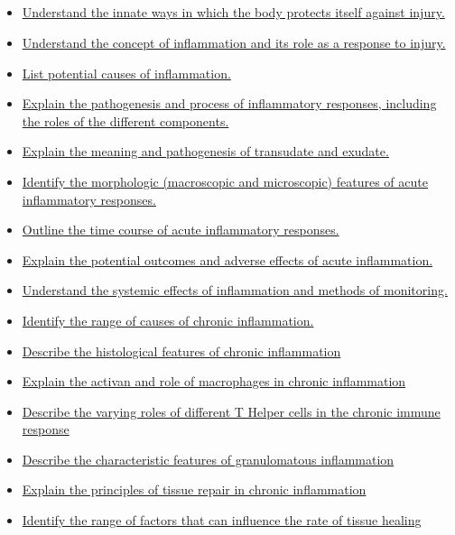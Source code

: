 \documentclass[10pt, a4paper]{article}
\newcommand{\MYhref}[3][blue]{\href{#2}{\color{#1}{#3}}}%
\begin{document}
\subsection{\MYhref[melbBlue]{https://notion.so/cfb3d9aecdcc461dbc4827f65294d71f}{Inflammation and Repair}} \begin{itemize} \item \href{https://www.notion.so/7a16210c4f044e0098a97ffd02f6284f}{Understand the innate ways in which the body protects itself against injury.} \item \href{https://www.notion.so/de0ad94c4ee7499f9188441b21b9ba35}{Understand the concept of inflammation and its role as a response to injury.} \item \href{https://www.notion.so/abeaf83d13394d3c971aca815b807020}{List potential causes of inflammation.} \item \href{https://www.notion.so/6f9427a3ba9648a78dfc0df6c00f97a3}{Explain the pathogenesis and process of inflammatory responses, including the roles of the different components.} \item \href{https://www.notion.so/e31f59b9f575471f96d0807f3c8216f6}{Explain the meaning and pathogenesis of transudate and exudate.} \item \href{https://www.notion.so/513317b8354b46ba98426fb92a0c48e1}{Identify the morphologic (macroscopic and microscopic) features of acute inflammatory responses.} \item \href{https://www.notion.so/9acba085bc0c44fe9d8ce8ffb4d723aa}{Outline the time course of acute inflammatory responses.} \item \href{https://www.notion.so/2c37b88df00d4c98aea370348fa4ce94}{Explain the potential outcomes and adverse effects of acute inflammation.} \item \href{https://www.notion.so/5d231658573a4abd99cfda5de47fffb1}{Understand the systemic effects of inflammation and methods of monitoring.} \item \href{https://www.notion.so/788e7652afc241fa99d123c543353672}{Identify the range of causes of chronic inflammation.} \item \href{https://www.notion.so/799a41fc8d26485ea00ac10335491a01}{Describe the histological features of chronic inflammation} \item \href{https://www.notion.so/898a508391ba4bee88f7a78f1ef57035}{Explain the activan and role of macrophages in chronic inflammation} \item \href{https://www.notion.so/aaba507b478e4d8897051be0db1bafc5}{Describe the varying roles of different T Helper cells in the chronic immune response} \item \href{https://www.notion.so/a668403aa2c14407932fd036ef4bdc3d}{Describe the characteristic features of granulomatous inflammation} \item \href{https://www.notion.so/b7a971a7dcc04fd5a64317afb38d98c0}{Explain the principles of tissue repair in chronic inflammation} \item \href{https://www.notion.so/4b37723b61f849c6ad74e3feb8b741ff}{Identify the range of factors that can influence the rate of tissue healing} \end{itemize}
\end{document}
